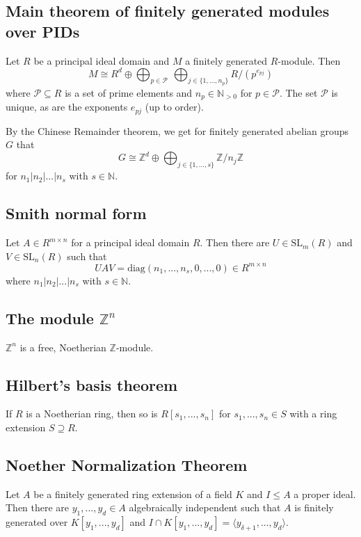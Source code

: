 \documentclass{scrartcl}
\newcommand{\N}{\mathbb{N}}
\newcommand{\Z}{\mathbb{Z}}
\begin{document}
\subsection{Main theorem of finitely generated modules over PIDs}
Let $R$ be a principal ideal domain and $M$ a finitely generated $R$-module. Then
\begin{equation*}
    M \cong R^d \oplus \bigoplus_{p \in \mathcal{P}} \ \bigoplus_{j \in \{1, ..., n_p\}} R / \left( p^{e_{pj}} \right)
\end{equation*}
where $\mathcal{P} \subseteq R$ is a set of prime elements and $n_p \in \N_{>0}$ for $p \in \mathcal{P}$. The set $\mathcal{P}$ is unique, as are the exponents $e_{pj}$ (up to order).

By the Chinese Remainder theorem, we get for finitely generated abelian groups $G$ that
\begin{equation*}
    G \cong \Z^d \oplus \bigoplus_{j \in \{1, ..., s\}} \Z/n_j\Z
\end{equation*}
for $n_1 | n_2 | ... | n_s$ with $s \in \N$.

\subsection{Smith normal form}
Let $A \in R^{m \times n}$ for a principal ideal domain $R$. Then there are $U \in \mathrm{SL}_m(R)$ and $V \in \mathrm{SL}_n(R)$ such that
\begin{equation*}
    U A V = \mathrm{diag}(n_1, ..., n_s, 0, ..., 0) \in R^{m \times n}
\end{equation*}
where $n_1 | n_2 | ... | n_s$ with $s \in \N$.

\subsection{The module $\Z^n$}
$\Z^n$ is a free, Noetherian $\Z$-module.

\subsection{Hilbert's basis theorem}
If $R$ is a Noetherian ring, then so is $R[s_1, ..., s_n]$ for $s_1, ..., s_n \in S$ with a ring extension $S \supseteq R$.

\subsection{Noether Normalization Theorem}
Let $A$ be a finitely generated ring extension of a field $K$ and $I \leq A$ a proper ideal.
Then there are $y_1, ..., y_d \in A$ algebraically independent such that $A$ is finitely generated over $K[y_1, ..., y_d]$ and $I \cap K[y_1, ..., y_d] = \langle y_{\delta + 1}, ..., y_d \rangle$.
\end{document}
